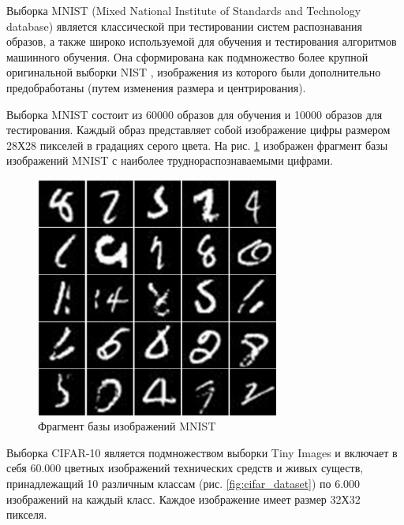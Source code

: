 Выборка MNIST (Mixed National Institute of Standards and Technology database) является классической при тестировании систем распознавания образов, а также широко используемой для обучения и тестирования алгоритмов машинного обучения. Она сформирована как подмножество более крупной оригинальной выборки NIST \cite{mnist}, изображения из которого были дополнительно предобработаны (путем изменения размера и центрирования). 

Выборка MNIST состоит из 60000 образов для обучения и 10000 образов для тестирования. Каждый образ представляет собой изображение цифры размером 28Х28 пикселей в градациях серого цвета. На рис. \ref{fig:mnist_example} изображен фрагмент базы изображений MNIST с наиболее труднораспознаваемыми цифрами.

\begin{figure}[h]
	\begin{center}
		\includegraphics[width=8cm]{man-source/images/ch3/pic3-12.pdf}
		\caption{Фрагмент базы изображений MNIST}		
		\label{fig:mnist_example}
	\end{center}
\end{figure}

Выборка CIFAR-10 \cite{krizhevsky2009learning} является подмножеством выборки Tiny Images \cite{torralba2008} и включает в себя 60.000 цветных изображений технических средств и живых существ, принадлежащий 10 различным классам (рис. \ref{fig:cifar_dataset}) по 6.000 изображений на каждый класс. Каждое изображение имеет размер 32Х32 пикселя.

